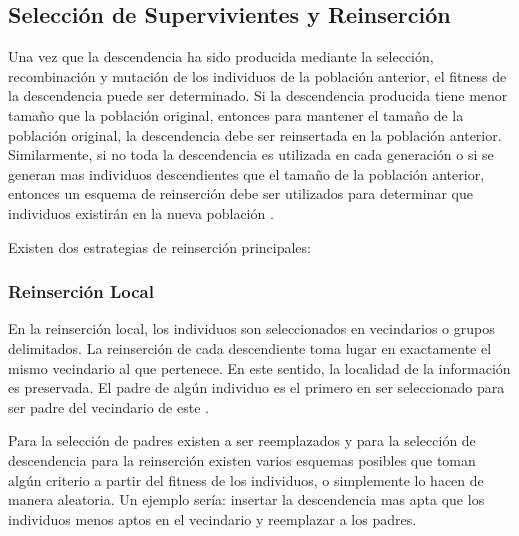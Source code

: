 \subsection{Selección de Supervivientes y Reinserción}
Una vez que la descendencia ha sido producida mediante la selección, recombinación y mutación de los individuos de la población anterior, el fitness de la descendencia puede ser determinado. Si la descendencia producida tiene menor tamaño que la población original, entonces para mantener el tamaño de la población original, la descendencia debe ser reinsertada en la población anterior. Similarmente, si no toda la descendencia es utilizada en cada generación o si se generan mas individuos descendientes que el tamaño de la población anterior, entonces un esquema de reinserción debe ser utilizados para determinar que individuos existirán en la nueva población \cite{geatbx}.

Existen dos estrategias de reinserción principales:


\subsubsection{Reinserción Local}
En la reinserción local, los individuos son seleccionados en vecindarios o grupos delimitados. La reinserción de cada descendiente toma lugar en exactamente el mismo vecindario al que pertenece. En este sentido, la localidad de la información es preservada. El padre de algún individuo es el primero en ser seleccionado para ser padre del vecindario de este \cite{geatbx}.

Para la selección de padres existen a ser reemplazados y para la selección de descendencia para la reinserción existen varios esquemas posibles que toman algún criterio a partir del fitness de los individuos, o simplemente lo hacen de manera aleatoria. Un ejemplo sería: insertar la descendencia mas apta que los individuos menos aptos en el vecindario y reemplazar a los padres.
